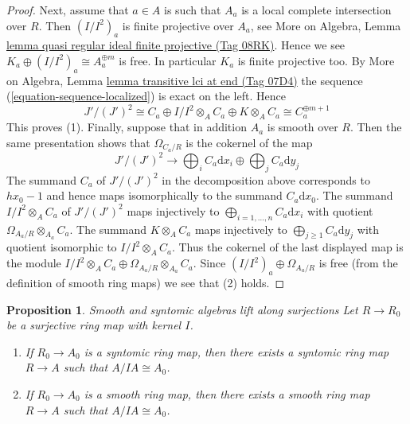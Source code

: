 \documentclass{amsart}
\newenvironment{slogan}{\comment}{\endcomment}
\theoremstyle{plain}
\newtheorem{proposition}[subsection]{Proposition}
\theoremstyle{definition}
\theoremstyle{remark}
\numberwithin{equation}{subsection}
\begin{document}
\begin{proof}
\medskip\noindent
Next, assume that $a \in A$ is such that $A_a$ is a local complete
intersection over $R$. Then $(I/I^2)_a$ is finite projective over $A_a$, see
More on Algebra, Lemma
\href{https://stacks.math.columbia.edu/tag/08RK}{lemma quasi regular ideal finite projective (Tag 08RK)}.
Hence we see $K_a \oplus (I/I^2)_a \cong A_a^{\oplus m}$ is free.
In particular $K_a$ is finite projective too.
By More on Algebra, Lemma \href{https://stacks.math.columbia.edu/tag/07D4}{lemma transitive lci at end (Tag 07D4)}
the sequence (\ref{equation-sequence-localized}) is exact on the left.
Hence
$$
J'/(J')^2 \cong
C_a \oplus I/I^2 \otimes_A C_a \oplus K \otimes_A C_a \cong
C_a^{\oplus m + 1}
$$
This proves (1). Finally, suppose that in addition $A_a$ is smooth over
$R$. Then the same presentation shows that $\Omega_{C_a/R}$
is the cokernel of the map
$$
J'/(J')^2 \longrightarrow
\bigoplus\nolimits_i C_a\text{d}x_i \oplus \bigoplus\nolimits_j C_a\text{d}y_j
$$
The summand $C_a$ of $J'/(J')^2$ in the decomposition above
corresponds to $hx_0 - 1$ and hence maps
isomorphically to the summand $C_a\text{d}x_0$. The summand
$I/I^2 \otimes_A C_a$ of $J'/(J')^2$ maps injectively to
$\bigoplus_{i = 1, \ldots, n} C_a\text{d}x_i$
with quotient $\Omega_{A_a/R} \otimes_{A_a} C_a$. The summand
$K \otimes_A C_a$ maps injectively to
$\bigoplus_{j \geq 1} C_a\text{d}y_j$ with quotient isomorphic to
$I/I^2 \otimes_A C_a$. Thus the cokernel of the last displayed
map is the module
$I/I^2 \otimes_A C_a \oplus \Omega_{A_a/R} \otimes_{A_a} C_a$.
Since $(I/I^2)_a \oplus \Omega_{A_a/R}$ is
free (from the definition of smooth ring maps) we see that (2) holds.
\end{proof}


\begin{proposition}
\label{proposition-lift-smooth}
\begin{slogan}
Smooth and syntomic algebras lift along surjections
\end{slogan}
Let $R \to R_0$ be a surjective ring map with kernel $I$.
\begin{enumerate}
\item If $R_0 \to A_0$ is a syntomic ring map, then there exists a syntomic
ring map $R \to A$ such that $A/IA \cong A_0$.
\item If $R_0 \to A_0$ is a smooth ring map, then there exists a smooth
ring map $R \to A$ such that $A/IA \cong A_0$.
\end{enumerate}
\end{proposition}
\end{document}
